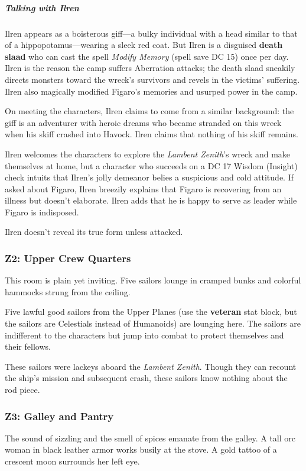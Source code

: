 \documentclass[10pt,a4paper,twoside,bg=print,twocolumn,openany,nodeprecatedcode]{dndbook}
\begin{document}
\subparagraph{Talking with Ilren}
Ilren appears as a boisterous giff—a bulky individual with a head similar to that of a hippopotamus—wearing a sleek red coat. But Ilren is a disguised \textbf{death slaad} who can cast the spell \textit{Modify Memory} (spell save DC 15) once per day. Ilren is the reason the camp suffers Aberration attacks; the death slaad sneakily directs monsters toward the wreck's survivors and revels in the victims' suffering. Ilren also magically modified Figaro's memories and usurped power in the camp.

On meeting the characters, Ilren claims to come from a similar background: the giff is an adventurer with heroic dreams who became stranded on this wreck when his skiff crashed into Havock. Ilren claims that nothing of his skiff remains.

Ilren welcomes the characters to explore the \textit{Lambent Zenith}'s wreck and make themselves at home, but a character who succeeds on a DC 17 Wisdom (Insight) check intuits that Ilren's jolly demeanor belies a suspicious and cold attitude. If asked about Figaro, Ilren breezily explains that Figaro is recovering from an illness but doesn't elaborate. Ilren adds that he is happy to serve as leader while Figaro is indisposed.

Ilren doesn't reveal its true form unless attacked.

\subsubsection{Z2: Upper Crew Quarters}
\begin{DndReadAloud}{}
This room is plain yet inviting. Five sailors lounge in cramped bunks and colorful hammocks strung from the ceiling.

\end{DndReadAloud}

Five lawful good sailors from the Upper Planes (use the \textbf{veteran} stat block, but the sailors are Celestials instead of Humanoids) are lounging here. The sailors are indifferent to the characters but jump into combat to protect themselves and their fellows.

These sailors were lackeys aboard the \textit{Lambent Zenith}. Though they can recount the ship's mission and subsequent crash, these sailors know nothing about the rod piece.

\subsubsection{Z3: Galley and Pantry}
\begin{DndReadAloud}{}
The sound of sizzling and the smell of spices emanate from the galley. A tall orc woman in black leather armor works busily at the stove. A gold tattoo of a crescent moon surrounds her left eye.

\end{DndReadAloud}
\end{document}
